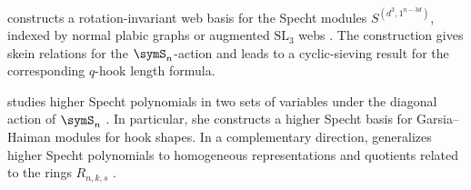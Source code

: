  constructs a rotation-invariant web basis for the Specht
modules $S^{(d^3,1^{n-3d})}$, indexed by normal plabic graphs or augmented
$\mathrm{SL}_3$ webs \cite{Kim2024x}.  The construction gives skein
relations for the $\symS_n$-action and leads to a cyclic-sieving result for
the corresponding $q$-hook length formula.

 studies higher Specht polynomials in two sets of
variables under the diagonal action of $\symS_n$ \cite{Gillespie2024x}.  In
particular, she constructs a higher Specht basis for Garsia--Haiman modules
for hook shapes.  In a complementary direction, 
generalizes higher Specht polynomials to homogeneous representations and
quotients related to the rings $R_{n,k,s}$ \cite{Zemel2025x}.
